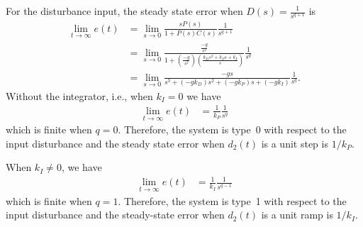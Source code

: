 For the disturbance input, the steady state error when $D(s) = \frac{1}{s^{q+1}}$ is
\begin{align*}
\lim_{t\to\infty}e(t) &= \lim_{s\to 0}\frac{sP(s)}{1+P(s)C(s)}\frac{1}{s^{q+1}} \\
					  &= \lim_{s\to 0} \frac{\frac{-g}{s^2}}{1+\left(\frac{-g}{s^2}\right)\left(\frac{k_Ds^2+k_Ps+k_I}{s}\right)}\frac{1}{s^q} \\
					  &= \lim_{s\to 0} \frac{-gs}{s^3+(-gk_D)s^2+(-gk_P)s + (-gk_I)}\frac{1}{s^q}.					  
\end{align*}
Without the integrator, i.e., when $k_I=0$ we have
\begin{align*}
\lim_{t\to\infty}e(t) &= \frac{1}{k_P}\frac{1}{s^q}
\end{align*}
which is finite when $q=0$.  Therefore, the system is type~0 with respect to the input disturbance and the steady state error when $d_2(t)$ is a unit step is $1/k_P$.  

When $k_I\neq 0$, we have
\begin{align*}
\lim_{t\to\infty}e(t) &= \frac{1}{k_I}\frac{1}{s^{q-1}}
\end{align*}
which is finite when $q=1$.  Therefore, the system is type~1 with respect to the input disturbance and the steady-state error when $d_2(t)$ is a unit ramp is $1/k_I$.  

